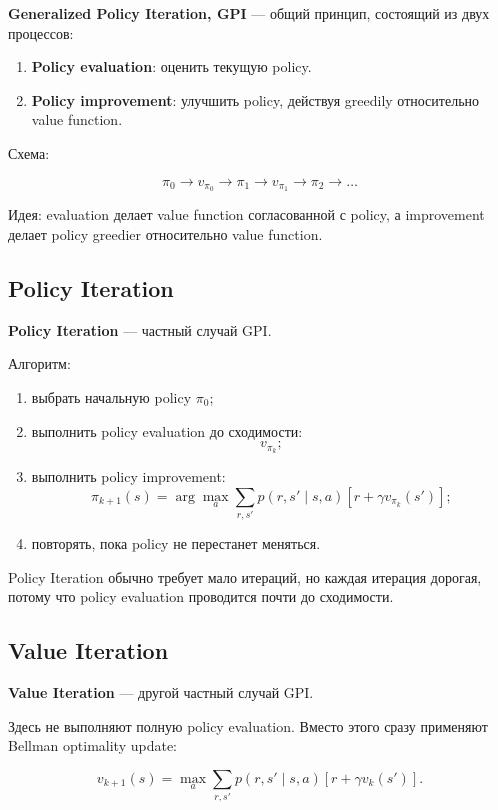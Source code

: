 \documentclass[a4paper,12pt]{article}
\begin{document}
\textbf{Generalized Policy Iteration, GPI} --- общий принцип, состоящий из двух процессов:

\begin{enumerate}
    \item \textbf{Policy evaluation}: оценить текущую policy.
    \item \textbf{Policy improvement}: улучшить policy, действуя greedily относительно value function.
\end{enumerate}

Схема:

\[
\pi_0
\rightarrow
v_{\pi_0}
\rightarrow
\pi_1
\rightarrow
v_{\pi_1}
\rightarrow
\pi_2
\rightarrow
\dots
\]

Идея: evaluation делает value function согласованной с policy, а improvement делает policy greedier относительно value function.

\subsection{Policy Iteration}

\textbf{Policy Iteration} --- частный случай GPI.

Алгоритм:

\begin{enumerate}
    \item выбрать начальную policy \(\pi_0\);
    \item выполнить policy evaluation до сходимости:
    \[
    v_{\pi_k};
    \]
    \item выполнить policy improvement:
    \[
    \pi_{k+1}(s)
    =
    \arg\max_a
    \sum_{r,s'}
    p(r,s'\mid s,a)
    [
    r + \gamma v_{\pi_k}(s')
    ];
    \]
    \item повторять, пока policy не перестанет меняться.
\end{enumerate}

Policy Iteration обычно требует мало итераций, но каждая итерация дорогая, потому что policy evaluation проводится почти до сходимости.

\subsection{Value Iteration}

\textbf{Value Iteration} --- другой частный случай GPI.

Здесь не выполняют полную policy evaluation. Вместо этого сразу применяют Bellman optimality update:

\[
v_{k+1}(s)
=
\max_a
\sum_{r,s'}
p(r,s'\mid s,a)
\left[
r + \gamma v_k(s')
\right].
\]
\end{document}
